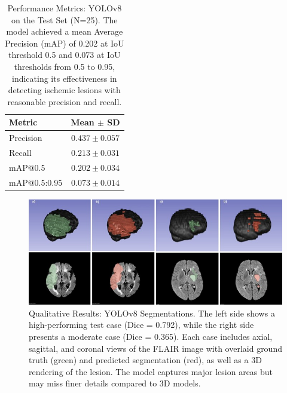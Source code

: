 \documentclass[12pt]{article}
\begin{document}
\begin{table}[tp]
\centering
\begin{tabular}{lc}
\toprule
Metric & Mean $\pm$ SD \\
\midrule
Precision & $0.437 \pm 0.057$ \\
Recall & $0.213 \pm 0.031$ \\
mAP@0.5 & $0.202 \pm 0.034$ \\
mAP@0.5:0.95 & $0.073 \pm 0.014$ \\
\bottomrule
\end{tabular}
\caption{Performance Metrics: YOLOv8 on the Test Set (N=25). The model achieved a mean Average Precision (mAP) of 0.202 at IoU threshold 0.5 and 0.073 at IoU thresholds from 0.5 to 0.95, indicating its effectiveness in detecting ischemic lesions with reasonable precision and recall.}\label{tab:yolov8_detection_metrics}
\end{table}


\begin{figure}[tp]
    \centering
    \includegraphics[width=\textwidth]{figures/Figure 6.jpg}
    \caption{Qualitative Results: YOLOv8 Segmentations. The left side shows a high-performing test case (Dice = 0.792), while the right side presents a moderate case (Dice = 0.365). Each case includes axial, sagittal, and coronal views of the FLAIR image with overlaid ground truth (green) and predicted segmentation (red), as well as a 3D rendering of the lesion. The model captures major lesion areas but may miss finer details compared to 3D models.}\label{fig:yolov8_qualitative}
\end{figure}


\end{document}

